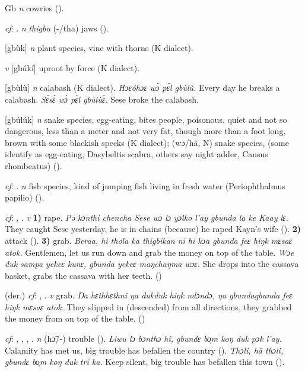 \begin{letter}{Gb}
 \textit{n} cowries (\citealt{Pichl1967}).

 \textit{cf}: . \textit{n} \textit{thigbu} (-/tha) jaws (\citealt{Pichl1967}).

 [gbùk] \textit{n} plant species, vine with thorns (K dialect). 

 \textit{v} [gbúkí] uproot by force (K dialect). 

 [gbùlù] \textit{n} calabash (K dialect). \textit{Hɔɛóhɔɛ wɔ̀ pɛ́l gbùlù.} Every day he breaks a calabash. \textit{Sɛ́sɛ́ wɔ̀ pɛ̀l gbùlùɛ̀.} Sese broke the calabash.

 [gbúlúk] \textit{n} snake species, egg-eating, bites people, poisonous, quiet and not so dangerous, less than a meter and not very fat, though more than a foot long, brown with some blackish specks (K dialect); (wɔ/hã, N) snake species, (some identify as egg-eating, Dasybeltis scabra, others say night adder, Causus rhombeatus) (\citealt{Pichl1967}). 

 \textit{cf}: . \textit{n} fish species, kind of jumping fish living in fresh water (Periophthalmus papilio) (\citealt{Pichl1967}). 

 \textit{cf}: , . \textit{v} \textbf{1)} rape. \textit{Pə kɔnthi chencha Sese wɔ lɔ yɔlko l'ay gbunda la ke Kaay lɛ.} They caught Sese yesterday, he is in chains (because) he raped Kayn's wife (\citealt{Pichl1967}). \textbf{2)} attack (\citealt{Pichl1967}). \textbf{3)} grab. \textit{Beraa, hi thola ka thigbikan ni hi kɔa gbunda feɛ hiŋk mɛsaɛ atok.} Gentlemen, let us run down and grab the money on top of the table. \textit{Wɔe duk sampa yekeɛ kunɛ, gbunda yekeɛ maŋchaŋma wɔɛ.} She drops into the cassava basket, grabs the cassava with her teeth. (\citealt{Pichl1967})

 (der.) \textit{cf}: , . \textit{v} grab. \textit{Ŋa hɛthhɛthni ŋa dukduk hiŋk ndɔndɔ, ŋa gbundagbunda feɛ hiŋk mɛsaɛ atok.} They slipped in (descended) from all directions, they grabbed the money from on top of the table. (\citealt{Pichl1967})

 \textit{cf}: , , , . \textit{n} (hɔ̃/-) trouble (\citealt{Pichl1967}). \textit{Liwu lɔ bɔnthɔ hĩ, gbundɛ bo̹m koŋ duk pɔk l'ay.} Calamity has met us, big trouble has befallen the country (\citealt{Pichl1967}). \textit{Thɔli, hã thɔli, gbundɛ bo̹m koŋ duk trï ka.} Keep silent, big trouble has befallen this town (\citealt{Pichl1967}).


\end{letter}
